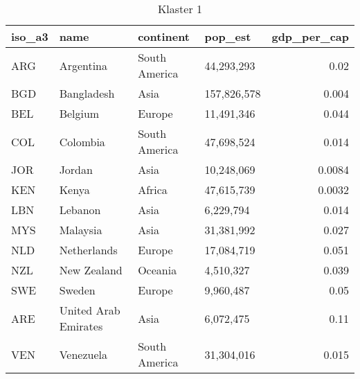\begin{table}
    \centering
    \caption{Klaster 1}
    \label{tab:cl1}
    \begin{tabular}{llllr}
        \toprule
        iso\_a3 & name                 & continent     & pop\_est    & gdp\_per\_cap \\
        \midrule
        ARG     & Argentina            & South America & 44,293,293  & 0.02          \\
        BGD     & Bangladesh           & Asia          & 157,826,578 & 0.004         \\
        BEL     & Belgium              & Europe        & 11,491,346  & 0.044         \\
        COL     & Colombia             & South America & 47,698,524  & 0.014         \\
        JOR     & Jordan               & Asia          & 10,248,069  & 0.0084        \\
        KEN     & Kenya                & Africa        & 47,615,739  & 0.0032        \\
        LBN     & Lebanon              & Asia          & 6,229,794   & 0.014         \\
        MYS     & Malaysia             & Asia          & 31,381,992  & 0.027         \\
        NLD     & Netherlands          & Europe        & 17,084,719  & 0.051         \\
        NZL     & New Zealand          & Oceania       & 4,510,327   & 0.039         \\
        SWE     & Sweden               & Europe        & 9,960,487   & 0.05          \\
        ARE     & United Arab Emirates & Asia          & 6,072,475   & 0.11          \\
        VEN     & Venezuela            & South America & 31,304,016  & 0.015         \\
        \bottomrule
    \end{tabular}
\end{table}
